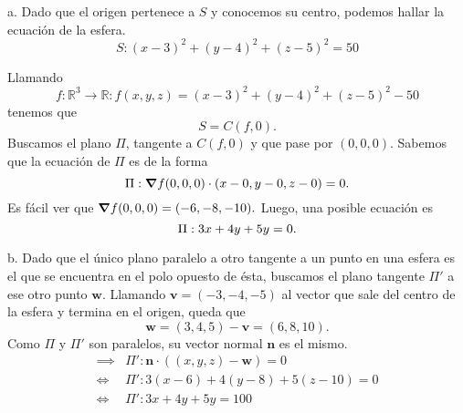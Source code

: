
\begin{solution}
    a. Dado que el origen pertenece a $S$ y conocemos su centro, podemos hallar la ecuación de la esfera.
    \[
        S:(x-3)^2 + (y-4)^2 + (z-5)^2 = 50
    \]
    \begin{center}
    \end{center}

    Llamando $$f:\mathbb{R}^3 \rightarrow \mathbb{R}:  f(x,y,z) = (x-3)^2 + (y-4)^2 + (z-5)^2 - 50$$
    tenemos que $$S=C(f,0). $$
    Buscamos el plano $\Pi$, tangente a $C(f,0)$ y que pase por $(0,0,0)$. Sabemos que la ecuación de  $\Pi$  es  de la forma
    \[
        \Pi:\grad f(0,0,0) \cdot (x-0,y-0,z-0) = 0.
    \]
    Es f\'acil ver que $\grad f(0,0,0) = (-6,-8,-10).$  Luego, una posible ecuaci\'on es
    \[\\[1pt]
        \Pi: 3x + 4y + 5y = 0.
    \]

    b. Dado que el único plano paralelo a otro tangente a un punto en una esfera es el que se encuentra en el polo opuesto de ésta, buscamos el plano tangente $\Pi'$ a ese otro punto $\mathbf{w}$. Llamando $\mathbf{v} = (-3,-4,-5)$ al vector que sale del centro de la esfera y termina en el origen, queda que
    \[
        \mathbf{w} = (3,4,5) - \mathbf{v} = (6,8,10).
    \]
    Como $\Pi$ y $\Pi'$ son paralelos, su vector normal $\textbf{n}$ es el mismo.
    \[
        \begin{aligned}
            \implies & \Pi ': \textbf{n} \cdot ((x,y,z) - \mathbf{w}) = 0 \\
            \iff     & \Pi ': 3(x-6) + 4(y-8) + 5(z-10) = 0               \\
            \iff     & \Pi ':3x + 4y + 5y = 100
        \end{aligned}
    \]


\end{solution}
